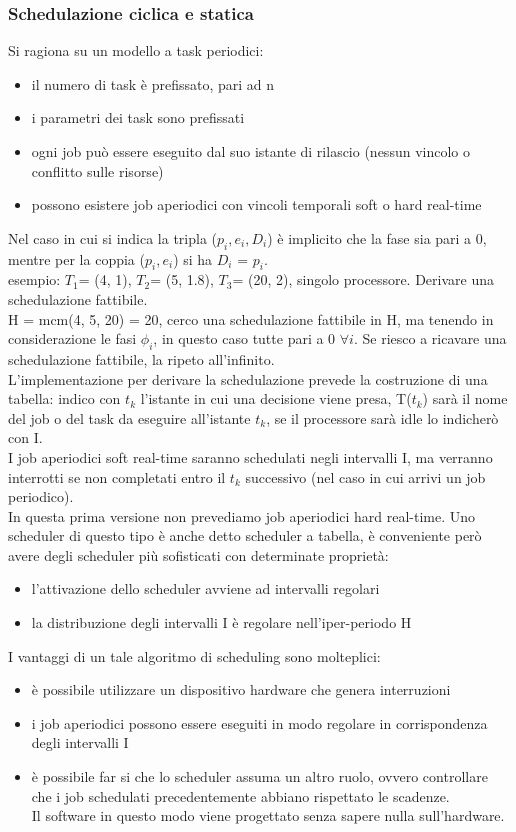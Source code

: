 \documentclass{article}
\begin{document}
\subsubsection{Schedulazione ciclica e statica}
Si ragiona su un modello a task periodici:
\begin{itemize}
\item il numero di task è prefissato, pari ad n
\item i parametri dei task sono prefissati
\item ogni job può essere eseguito dal suo istante di rilascio (nessun vincolo o conflitto sulle risorse)
\item possono esistere job aperiodici con vincoli temporali soft o hard real-time
\end{itemize}
Nel caso in cui si indica la tripla ($p_i, e_i, D_i$) è implicito che la fase sia pari a 0, mentre per la coppia ($p_i, e_i$) si ha $D_i$ = $p_i$.\\ esempio: $T_1$= (4, 1), $T_2$= (5, 1.8), $T_3$= (20, 2), singolo processore. Derivare una schedulazione fattibile.\\ H = mcm(4, 5, 20) = 20, cerco una schedulazione fattibile in H, ma tenendo in considerazione le fasi $\phi_i$, in questo caso tutte pari a 0 $\forall i$. Se riesco a ricavare una schedulazione fattibile, la ripeto all'infinito.\\ L'implementazione per derivare la schedulazione prevede la costruzione di una tabella: indico con $t_k$ l'istante in cui una decisione viene presa, T($t_k$) sarà il nome del job o del task da eseguire all'istante $t_k$, se il processore sarà idle lo indicherò con I.\\I job aperiodici soft real-time saranno schedulati negli intervalli I, ma verranno interrotti se non completati entro il $t_k$ successivo (nel caso in cui arrivi un job periodico).\\ In questa prima versione non prevediamo job aperiodici hard real-time. Uno scheduler di questo tipo è anche detto scheduler a tabella, è conveniente però avere degli scheduler più sofisticati con determinate proprietà:
\begin{itemize}
\item l'attivazione dello scheduler avviene ad intervalli regolari
\item la distribuzione degli intervalli I è regolare nell'iper-periodo H
\end{itemize}
I vantaggi di un tale algoritmo di scheduling sono molteplici:
\begin{itemize}
\item è possibile utilizzare un dispositivo hardware che genera interruzioni
\item i job aperiodici possono essere eseguiti in modo regolare in corrispondenza degli intervalli I
\item è possibile far si che lo scheduler assuma un altro ruolo, ovvero controllare che i job schedulati precedentemente abbiano rispettato le scadenze.\\ Il software in questo modo viene progettato senza sapere nulla sull'hardware.
\end{itemize}
\end{document}
